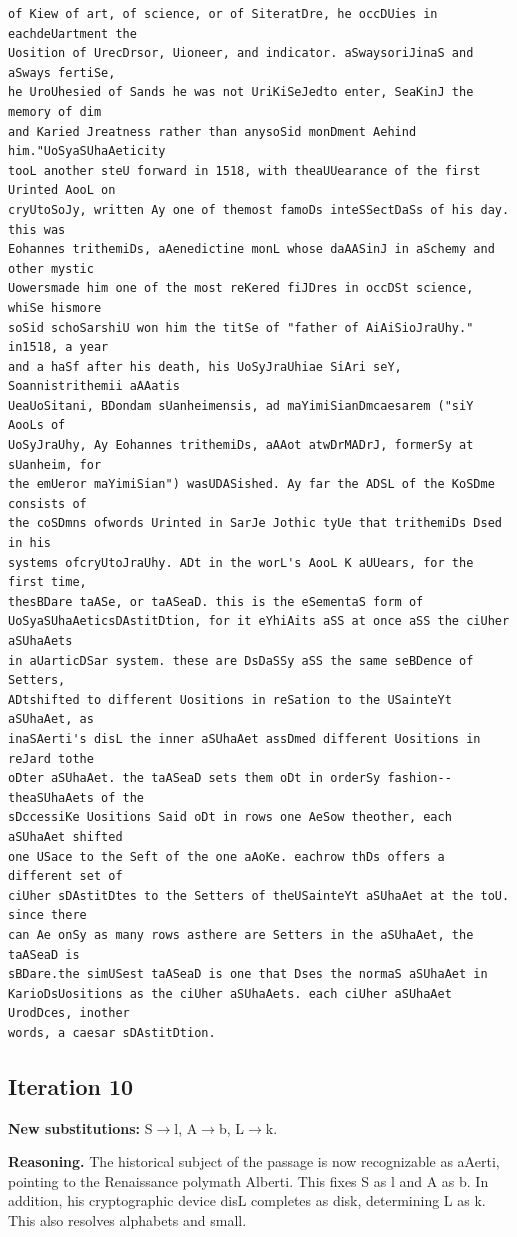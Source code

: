 \documentclass[12pt,a4paper]{article}
\begin{document}
\begin{lstlisting}[caption={Complete text after iteration 9}, label={lst:iter9}]
of Kiew of art, of science, or of SiteratDre, he occDUies in eachdeUartment the
Uosition of UrecDrsor, Uioneer, and indicator. aSwaysoriJinaS and aSways fertiSe,
he UroUhesied of Sands he was not UriKiSeJedto enter, SeaKinJ the memory of dim
and Karied Jreatness rather than anysoSid monDment Aehind him."UoSyaSUhaAeticity
tooL another steU forward in 1518, with theaUUearance of the first Urinted AooL on
cryUtoSoJy, written Ay one of themost famoDs inteSSectDaSs of his day. this was
Eohannes trithemiDs, aAenedictine monL whose daAASinJ in aSchemy and other mystic
Uowersmade him one of the most reKered fiJDres in occDSt science, whiSe hismore
soSid schoSarshiU won him the titSe of "father of AiAiSioJraUhy." in1518, a year
and a haSf after his death, his UoSyJraUhiae SiAri seY, Soannistrithemii aAAatis
UeaUoSitani, BDondam sUanheimensis, ad maYimiSianDmcaesarem ("siY AooLs of
UoSyJraUhy, Ay Eohannes trithemiDs, aAAot atwDrMADrJ, formerSy at sUanheim, for
the emUeror maYimiSian") wasUDASished. Ay far the ADSL of the KoSDme consists of
the coSDmns ofwords Urinted in SarJe Jothic tyUe that trithemiDs Dsed in his
systems ofcryUtoJraUhy. ADt in the worL's AooL K aUUears, for the first time,
thesBDare taASe, or taASeaD. this is the eSementaS form of
UoSyaSUhaAeticsDAstitDtion, for it eYhiAits aSS at once aSS the ciUher aSUhaAets
in aUarticDSar system. these are DsDaSSy aSS the same seBDence of Setters,
ADtshifted to different Uositions in reSation to the USainteYt aSUhaAet, as
inaSAerti's disL the inner aSUhaAet assDmed different Uositions in reJard tothe
oDter aSUhaAet. the taASeaD sets them oDt in orderSy fashion--theaSUhaAets of the
sDccessiKe Uositions Said oDt in rows one AeSow theother, each aSUhaAet shifted
one USace to the Seft of the one aAoKe. eachrow thDs offers a different set of
ciUher sDAstitDtes to the Setters of theUSainteYt aSUhaAet at the toU. since there
can Ae onSy as many rows asthere are Setters in the aSUhaAet, the taASeaD is
sBDare.the simUSest taASeaD is one that Dses the normaS aSUhaAet in
KarioDsUositions as the ciUher aSUhaAets. each ciUher aSUhaAet UrodDces, inother
words, a caesar sDAstitDtion.
\end{lstlisting}

\clearpage
\subsection{Iteration 10}
\textbf{New substitutions:} S$\to$l, A$\to$b, L$\to$k.

\textbf{Reasoning.} The historical subject of the passage is now recognizable as aAerti, pointing to the Renaissance polymath Alberti. This fixes S as l and A as b. In addition, his cryptographic device disL completes as disk, determining L as k. This also resolves alphabets and small.
\end{document}
